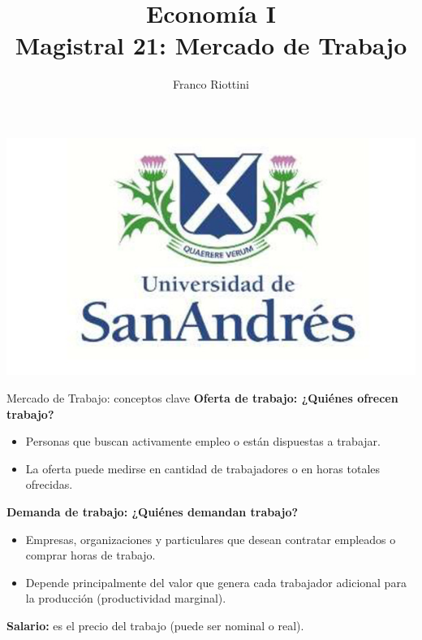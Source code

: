 \documentclass{beamer}
\title[Economía I]{Economía I \vspace{4mm}
\\ Magistral 21: Mercado de Trabajo}
\date{}
\author[Franco Riottini]{Franco Riottini}
\institute[]{Universidad de San Andrés}
\begin{document}
\begin{frame}
\titlepage
\centering

\includegraphics[scale=0.2]{../Figures/logoUDESA.jpg} 
\end{frame}

\begin{frame}{Mercado de Trabajo: conceptos clave}
    \vspace{0.3cm}
    \textbf{Oferta de trabajo: ¿Quiénes ofrecen trabajo?}
    \begin{itemize}
        \item Personas que buscan activamente empleo o están dispuestas a trabajar.
        \item La oferta puede medirse en cantidad de trabajadores o en horas totales ofrecidas.
    \end{itemize}

    \vspace{0.3cm}

    \textbf{Demanda de trabajo: ¿Quiénes demandan trabajo?}
    \begin{itemize}
        \item Empresas, organizaciones y particulares que desean contratar empleados o comprar horas de trabajo.
        \item Depende principalmente del valor que genera cada trabajador adicional para la producción (productividad marginal).
    \end{itemize}

    \vspace{0.3cm}

    \textbf{Salario:} es el precio del trabajo (puede ser nominal o real).
\end{frame}
\end{document}
